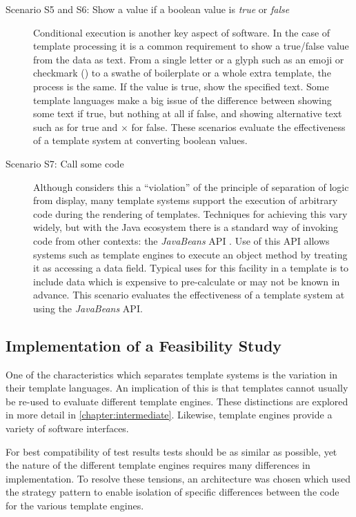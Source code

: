 \begin{description}
\item[Scenario S5 and S6: Show a value if a boolean value is \emph{true} or \emph{false}] \hfill

Conditional execution is another key aspect of software. In the case of template processing it is a common requirement to show a true/false value from the data as text. From a single letter or a glyph such as an emoji or checkmark (\checkmark) to a swathe of boilerplate or a whole extra template, the process is the same. If the value is true, show the specified text. Some template languages make a big issue of the difference between showing some text if true, but nothing at all if false, and showing alternative text such as \checkmark for true and $\times$ for false. These scenarios evaluate the effectiveness of a template system at converting boolean values.

\item[Scenario S7: Call some code] \hfill

Although \citeauthor{Parr2004} considers this a \enquote{violation} of the principle of separation of logic from display, many template systems support the execution of arbitrary code during the rendering of templates. Techniques for achieving this vary widely, but with the Java ecosystem there is a standard way of invoking code from other contexts: the \emph{JavaBeans} API \citep{Oracle2018JavaBean}. Use of this API allows systems such as template engines to execute an object method by treating it as accessing a data field. Typical uses for this facility in a template is to include data which is expensive to pre-calculate or may not be known in advance. This scenario evaluates the effectiveness of a template system at using the \emph{JavaBeans} API.

\end{description}

\subsection{Implementation of a Feasibility Study}

One of the characteristics which separates template systems is the variation in their template languages. An implication of this is that templates cannot usually be re-used to evaluate different template engines. These distinctions are explored in more detail in \autoref{chapter:intermediate}. Likewise, template engines provide a variety of software interfaces.

For best compatibility of test results tests should be as similar as possible, yet the nature of the different template engines requires many differences in implementation. To resolve these tensions, an architecture was chosen which used the strategy pattern \citep{Gamma1994} to enable isolation of specific differences between the code for the various template engines.

